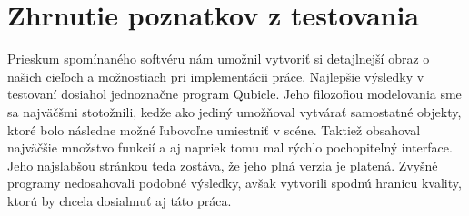 \section{Zhrnutie poznatkov z testovania}
Prieskum spomínaného softvéru nám umožnil vytvoriť si detajlnejší obraz o našich cieľoch a možnostiach pri implementácii práce. 
Najlepšie výsledky v testovaní dosiahol jednoznačne program Qubicle. Jeho filozofiou modelovania sme sa najväčšmi stotožnili, kedže ako jediný umožňoval vytvárať samostatné objekty, ktoré bolo následne možné ľubovoľne umiestniť v scéne. Taktiež obsahoval najväčšie množstvo funkcií a aj napriek tomu mal rýchlo pochopiteľný interface. Jeho najslabšou stránkou teda zostáva, že jeho plná verzia je platená.
Zvyšné programy nedosahovali podobné výsledky, avšak vytvorili spodnú hranicu kvality, ktorú by chcela dosiahnuť aj táto práca.


